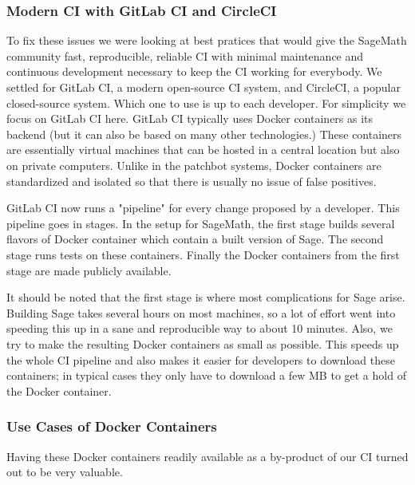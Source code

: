 \documentclass{deliverablereport}
\begin{document}
\subsubsection{Modern CI with GitLab CI and CircleCI}
To fix these issues we were looking at best pratices that would give the
SageMath community fast, reproducible, reliable CI with minimal maintenance and
continuous development necessary to keep the CI working for everybody.  We
settled for GitLab CI, a modern open-source CI system, and CircleCI, a popular
closed-source system. Which one to use is up to each developer. For simplicity
we focus on GitLab CI here. GitLab CI typically uses Docker containers as its
backend (but it can also be based on many other technologies.) These containers
are essentially virtual machines that can be hosted in a central location but
also on private computers. Unlike in the patchbot systems, Docker containers
are standardized and isolated so that there is usually no issue of false
positives. %

GitLab CI now runs a "pipeline" for every change proposed by a developer.
This pipeline goes in stages. In the setup for SageMath, the first stage builds
several flavors of Docker container which contain a built version of Sage. The
second stage runs tests on these containers. Finally the Docker containers from
the first stage are made publicly available.

It should be noted that the first stage is where most complications for Sage
arise. Building Sage takes several hours on most machines, so a lot of effort
went into speeding this up in a sane and reproducible way to about 10 minutes.
Also, we try to make the resulting Docker containers as small as possible. This
speeds up the whole CI pipeline and also makes it easier for developers to
download these containers; in typical cases they only have to download a few MB
to get a hold of the Docker container.

\subsubsection{Use Cases of Docker Containers}
Having these Docker containers readily available as a by-product of our CI turned out to be very valuable.
\end{document}
